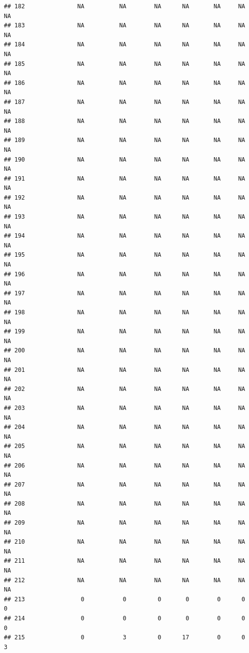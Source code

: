 \documentclass[
]{article}
\begin{document}
\begin{verbatim}
## 182               NA          NA        NA      NA       NA     NA     NA
## 183               NA          NA        NA      NA       NA     NA     NA
## 184               NA          NA        NA      NA       NA     NA     NA
## 185               NA          NA        NA      NA       NA     NA     NA
## 186               NA          NA        NA      NA       NA     NA     NA
## 187               NA          NA        NA      NA       NA     NA     NA
## 188               NA          NA        NA      NA       NA     NA     NA
## 189               NA          NA        NA      NA       NA     NA     NA
## 190               NA          NA        NA      NA       NA     NA     NA
## 191               NA          NA        NA      NA       NA     NA     NA
## 192               NA          NA        NA      NA       NA     NA     NA
## 193               NA          NA        NA      NA       NA     NA     NA
## 194               NA          NA        NA      NA       NA     NA     NA
## 195               NA          NA        NA      NA       NA     NA     NA
## 196               NA          NA        NA      NA       NA     NA     NA
## 197               NA          NA        NA      NA       NA     NA     NA
## 198               NA          NA        NA      NA       NA     NA     NA
## 199               NA          NA        NA      NA       NA     NA     NA
## 200               NA          NA        NA      NA       NA     NA     NA
## 201               NA          NA        NA      NA       NA     NA     NA
## 202               NA          NA        NA      NA       NA     NA     NA
## 203               NA          NA        NA      NA       NA     NA     NA
## 204               NA          NA        NA      NA       NA     NA     NA
## 205               NA          NA        NA      NA       NA     NA     NA
## 206               NA          NA        NA      NA       NA     NA     NA
## 207               NA          NA        NA      NA       NA     NA     NA
## 208               NA          NA        NA      NA       NA     NA     NA
## 209               NA          NA        NA      NA       NA     NA     NA
## 210               NA          NA        NA      NA       NA     NA     NA
## 211               NA          NA        NA      NA       NA     NA     NA
## 212               NA          NA        NA      NA       NA     NA     NA
## 213                0           0         0       0        0      0      0
## 214                0           0         0       0        0      0      0
## 215                0           3         0      17        0      0      3

\end{verbatim}
\end{document}

